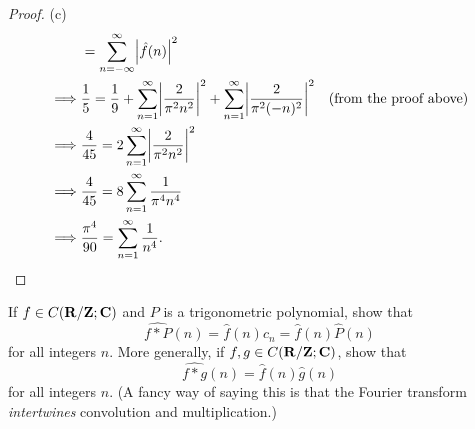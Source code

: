 \begin{proof}{(c)}
\begin{align*}
                 & = \sum_{n = -\infty}^\infty \abs{\hat{f}(n)}^2                                                                                                                     \\
        \implies & \frac{1}{5} = \frac{1}{9} + \sum_{n = 1}^\infty \abs{\frac{2}{\pi^2 n^2}}^2 + \sum_{n = 1}^\infty \abs{\frac{2}{\pi^2 (-n)^2}}^2 & \text{(from the proof above)}   \\
        \implies & \frac{4}{45} = 2 \sum_{n = 1}^\infty \abs{\frac{2}{\pi^2 n^2}}^2                                                                                                   \\
        \implies & \frac{4}{45} = 8 \sum_{n = 1}^\infty \frac{1}{\pi^4 n^4}                                                                                                           \\
        \implies & \frac{\pi^4}{90} = \sum_{n = 1}^\infty \frac{1}{n^4}.
    \end{align*}
\end{proof}

\begin{exercise}\label{ex 5.5.3}
    If \(f \in C(\mathbf{R} / \mathbf{Z} ; \mathbf{C})\) and \(P\) is a trigonometric polynomial, show that
    \[
        \widehat{f * P}(n) = \hat{f}(n) c_n = \hat{f}(n) \hat{P}(n)
    \]
    for all integers \(n\).
    More generally, if \(f, g \in C(\mathbf{R} / \mathbf{Z} ; \mathbf{C})\), show that
    \[
        \widehat{f * g}(n) = \hat{f}(n) \hat{g}(n)
    \]
    for all integers \(n\).
    (A fancy way of saying this is that the Fourier transform \emph{intertwines} convolution and multiplication.)
\end{exercise}

